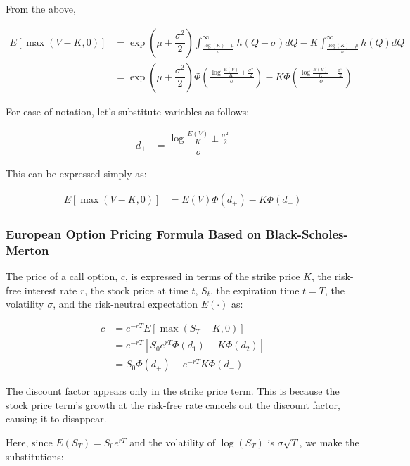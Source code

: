 \documentclass[uplatex]{jsarticle}
\begin{document}
From the above,

\begin{align}
	E \left[ \max(V-K,0) \right] & = \exp( \mu + \dfrac{\sigma^{2} }{2}) \int^{\infty}_{\frac{\log(K) - \mu}{\sigma}} h(Q - \sigma) dQ - K \int^{\infty}_{\frac{\log(K) - \mu}{\sigma}} h(Q) dQ\\
	 & = \exp( \mu + \dfrac{\sigma^{2} }{2}) \Phi \left( \frac{ \log \frac{E(V)}{K} + \frac{\sigma^{2}}{2} }{\sigma} \right) - K \Phi \left( \frac{ \log \frac{E(V)}{K} - \frac{\sigma^{2}}{2} }{\sigma} \right)
\end{align}

For ease of notation, let's substitute variables as follows:

\begin{align}
	d_{\pm} & = \dfrac{ \log \frac{E(V)}{K} \pm \frac{\sigma^{2}}{2} }{ \sigma }
\end{align}

This can be expressed simply as:

\begin{align}
	E \left[ \max(V-K,0) \right] & = E(V) \Phi (d_{+}) - K \Phi (d_{-})
\end{align}

\subsubsection{European Option Pricing Formula Based on Black-Scholes-Merton}

The price of a call option, $c$, is expressed in terms of the strike price $K$, the risk-free interest rate $r$, the stock price at time $t$, $S_{t}$, the expiration time $t=T$, the volatility $\sigma$, and the risk-neutral expectation $E( \cdot )$ as:

\begin{align}
	c & = e^{-rT} E \left[ \max(S_{T}-K,0) \right] \\
	& = e^{-rT} \left[ S_{0} e^{rT} \Phi (d_{1}) - K \Phi(d_{2}) \right] \\
	& = S_{0} \Phi (d_{+}) - e^{-rT} K \Phi(d_{-})
\end{align}

The discount factor appears only in the strike price term. This is because the stock price term's growth at the risk-free rate cancels out the discount factor, causing it to disappear.

Here, since $E(S_{T}) = S_{0} e^{rT}$ and the volatility of $\log(S_{T})$ is $\sigma \sqrt{T}$, we make the substitutions:
\end{document}
